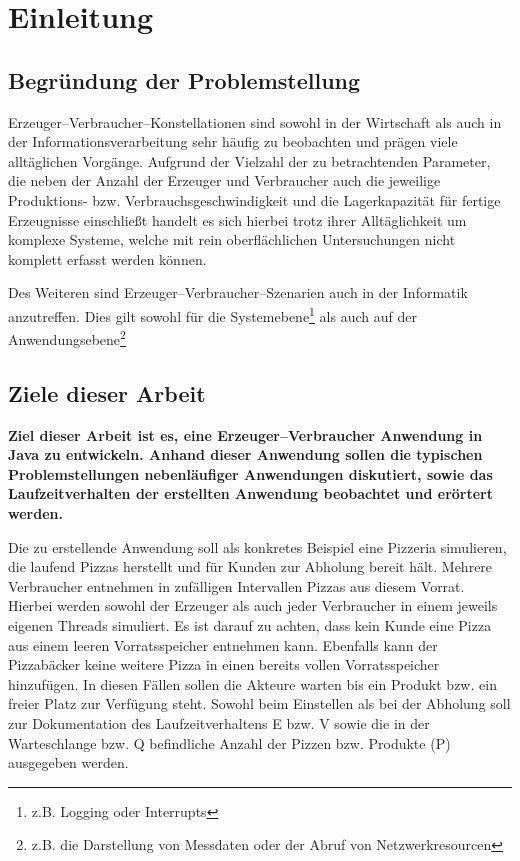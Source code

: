 \section{Einleitung} %
\label{sec:einleitung}

\subsection{Begründung der Problemstellung} %
\label{sub:begrundung_der_problemstellung}
Erzeuger–Verbraucher–Konstellationen sind sowohl in der Wirtschaft als auch in der Informationsverarbeitung sehr häufig zu beobachten und prägen viele alltäglichen Vorgänge. Aufgrund der Vielzahl der zu betrachtenden Parameter, die neben der Anzahl der Erzeuger und Verbraucher auch die jeweilige Produktions- bzw. Verbrauchsgeschwindigkeit und die Lagerkapazität für fertige Erzeugnisse einschließt handelt es sich hierbei trotz ihrer Alltäglichkeit um komplexe Systeme, welche mit rein oberflächlichen Untersuchungen nicht komplett erfasst werden können.

Des Weiteren sind Erzeuger–Verbraucher–Szenarien auch in der Informatik anzutreffen. Dies gilt sowohl für die Systemebene\footnote{z.B. Logging oder Interrupts} als auch auf der Anwendungsebene\footnote{z.B. die Darstellung von Messdaten oder der Abruf von Netzwerkresourcen}


\subsection{Ziele dieser Arbeit} %
\label{sub:ziele_dieser_arbeit}
\textbf{Ziel dieser Arbeit ist es, eine Erzeuger–Verbraucher Anwendung in Java zu entwickeln. Anhand dieser Anwendung sollen die typischen Problemstellungen nebenläufiger Anwendungen diskutiert, sowie das Laufzeitverhalten der erstellten Anwendung beobachtet und erörtert werden.}

Die zu erstellende Anwendung soll als konkretes Beispiel eine Pizzeria simulieren, die laufend Pizzas herstellt und für Kunden zur Abholung bereit hält. Mehrere Verbraucher entnehmen in zufälligen Intervallen Pizzas aus diesem Vorrat. Hierbei werden sowohl der Erzeuger als auch jeder Verbraucher in einem jeweils eigenen Threads simuliert.  Es ist darauf zu achten, dass kein Kunde eine Pizza aus einem leeren Vorratsspeicher entnehmen kann. Ebenfalls kann der Pizzabäcker keine weitere Pizza in einen bereits vollen Vorratsspeicher hinzufügen. In diesen Fällen sollen die Akteure warten bis ein Produkt bzw. ein freier Platz zur Verfügung steht. Sowohl beim Einstellen als bei der Abholung soll zur Dokumentation des Laufzeitverhaltens \ac{E} bzw. \ac{V} sowie die in der Warteschlange bzw. \ac{Q} befindliche Anzahl der Pizzen bzw. Produkte (P) ausgegeben werden.

